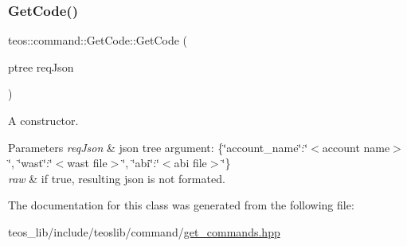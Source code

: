 \subsubsection{\texorpdfstring{Get\+Code()}{GetCode()}\hspace{0.1cm}{\footnotesize\ttfamily [2/2]}}
{\footnotesize\ttfamily teos\+::command\+::\+Get\+Code\+::\+Get\+Code (\begin{DoxyParamCaption}\item[{ptree}]{req\+Json }\end{DoxyParamCaption})\hspace{0.3cm}{\ttfamily [inline]}}



A constructor. 


\begin{DoxyParams}{Parameters}
{\em req\+Json} & json tree argument\+: \{\char`\"{}account\+\_\+name\char`\"{}\+:\char`\"{}$<$account name$>$\char`\"{}, \char`\"{}wast\char`\"{}\+:\char`\"{}$<$wast file$>$\char`\"{}, \char`\"{}abi\char`\"{}\+:\char`\"{}$<$abi file$>$\char`\"{}\} \\
\hline
{\em raw} & if true, resulting json is not formated. \\
\hline
\end{DoxyParams}


The documentation for this class was generated from the following file\+:\begin{DoxyCompactItemize}
\item 
teos\+\_\+lib/include/teoslib/command/\mbox{\hyperlink{get__commands_8hpp}{get\+\_\+commands.\+hpp}}\end{DoxyCompactItemize}
